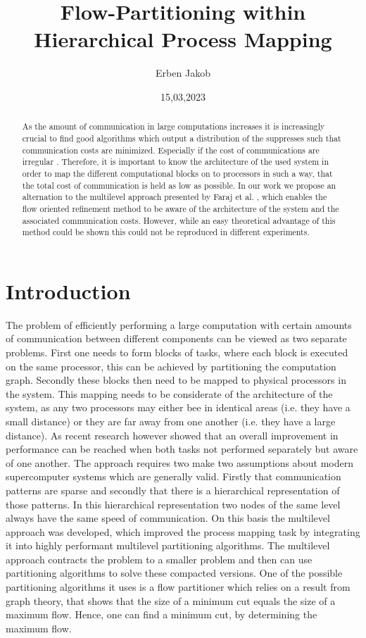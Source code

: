 \documentclass[acmsmall,nonacm,screen,review]{acmart}
\title{Flow-Partitioning within Hierarchical Process Mapping}
\author{Erben Jakob}
\affiliation{%
  \institution{Heidelberg University}
  \streetaddress{Im Neuenheimer Feld 205}
  \city{Heidelberg}
  \state{Baden-Württemberg}
  \country{Germany}
  \postcode{69120}
}
\date{15,03,2023}
\begin{document}
\begin{abstract}
As the amount of communication in large computations increases it is increasingly 
crucial to find good algorithms which output a distribution of the suppresses such that
communication costs are minimized. Especially if the cost of communications are irregular 
\cite{predari2021mpi}. Therefore, it is important to know the architecture of the used 
system in order to map the different computational blocks on to processors in such a way, 
that the total cost of communication is held as low as possible. 
In our work we propose an alternation to the multilevel approach  presented by Faraj et 
al. \cite{Far20}, which enables the flow oriented refinement method to be aware of
the architecture of the system and the associated communication costs. 
However, while an easy theoretical advantage of this method could be shown this could 
not be reproduced in different experiments. 
\end{abstract}
\maketitle

\section{Introduction}
The problem of efficiently performing a large computation with certain amounts of 
communication between different components can be viewed as two separate problems.
First one needs to form blocks of tasks, where each block is executed on the same processor,
this can be achieved by partitioning the computation graph. Secondly these blocks then need
to be mapped to physical processors in the system. This mapping needs to be considerate of 
the architecture of the system, as any two processors may either bee in identical areas 
(i.e. they have a small distance) or they are far away from one another (i.e. they have a 
large distance). As recent research \cite{berti2006mpi} however showed that an overall 
improvement in performance can be reached when both tasks not performed separately but 
aware of one another. The approach requires two make two assumptions about modern 
supercomputer systems which are generally valid. Firstly that communication patterns are
sparse and secondly that there is a hierarchical representation of those patterns. In this 
hierarchical representation two nodes of the same level always have the same speed of 
communication. On this basis the multilevel approach was developed, which improved the process
mapping task by integrating it into highly performant multilevel partitioning algorithms. 
The multilevel approach contracts the problem to a smaller problem and then can use partitioning
algorithms to solve these compacted versions. One of the possible partitioning algorithms it 
uses is a flow partitioner which relies on a result from graph theory, that shows that the size 
of a minimum cut equals the size of a maximum flow. Hence, one can find a minimum cut, by 
determining the maximum flow.
\end{document}
